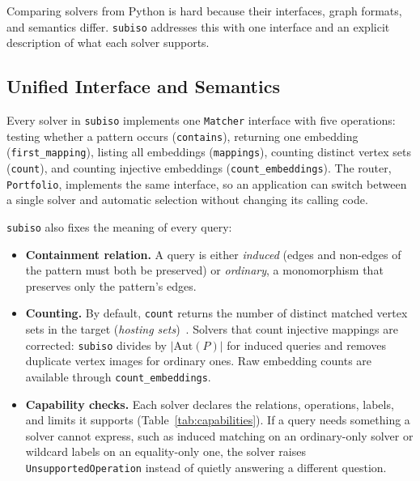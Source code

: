 \documentclass[11pt,a4paper]{article}
\begin{document}
Comparing solvers from Python is hard because their interfaces, graph formats, and semantics differ. \texttt{subiso} addresses this with one interface and an explicit description of what each solver supports.

\subsection{Unified Interface and Semantics}

Every solver in \texttt{subiso} implements one \texttt{Matcher} interface with five operations: testing whether a pattern occurs (\texttt{contains}), returning one embedding (\texttt{first\_mapping}), listing all embeddings (\texttt{mappings}), counting distinct vertex sets (\texttt{count}), and counting injective embeddings (\texttt{count\_embeddings}). The router, \texttt{Portfolio}, implements the same interface, so an application can switch between a single solver and automatic selection without changing its calling code.

\texttt{subiso} also fixes the meaning of every query:
\begin{itemize}
    \item \textbf{Containment relation.} A query is either \emph{induced} (edges and non-edges of the pattern must both be preserved) or \emph{ordinary}, a monomorphism that preserves only the pattern's edges.
    \item \textbf{Counting.} By default, \texttt{count} returns the number of distinct matched vertex sets in the target (\emph{hosting sets})~\cite{ribeiro2021counting}. Solvers that count injective mappings are corrected: \texttt{subiso} divides by $|\text{Aut}(P)|$ for induced queries and removes duplicate vertex images for ordinary ones. Raw embedding counts are available through \texttt{count\_embeddings}.
    \item \textbf{Capability checks.} Each solver declares the relations, operations, labels, and limits it supports (Table~\ref{tab:capabilities}). If a query needs something a solver cannot express, such as induced matching on an ordinary-only solver or wildcard labels on an equality-only one, the solver raises \texttt{UnsupportedOperation} instead of quietly answering a different question.
\end{itemize}
\end{document}
